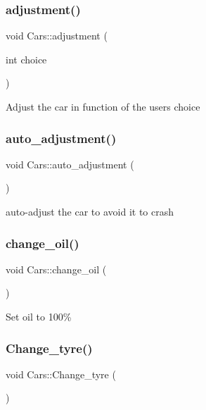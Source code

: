 \subsubsection{\texorpdfstring{adjustment()}{adjustment()}}
{\footnotesize\ttfamily void Cars\+::adjustment (\begin{DoxyParamCaption}\item[{int}]{choice }\end{DoxyParamCaption})}

Adjust the car in function of the user\textquotesingle{}s choice \mbox{\label{class_cars_ae7e733fb41d03d016dd0c7d5a047f9c9}} 
\subsubsection{\texorpdfstring{auto\+\_\+adjustment()}{auto\_adjustment()}}
{\footnotesize\ttfamily void Cars\+::auto\+\_\+adjustment (\begin{DoxyParamCaption}{ }\end{DoxyParamCaption})}

auto-\/adjust the car to avoid it to crash \mbox{\label{class_cars_a04b60bab05e297effbb029d8fe2d70b0}} 
\subsubsection{\texorpdfstring{change\+\_\+oil()}{change\_oil()}}
{\footnotesize\ttfamily void Cars\+::change\+\_\+oil (\begin{DoxyParamCaption}{ }\end{DoxyParamCaption})}

Set oil to 100\% \mbox{\label{class_cars_a0a127960d5e34f1647f9fe0142bcdce1}} 
\subsubsection{\texorpdfstring{Change\+\_\+tyre()}{Change\_tyre()}}
{\footnotesize\ttfamily void Cars\+::\+Change\+\_\+tyre (\begin{DoxyParamCaption}{ }\end{DoxyParamCaption})}

